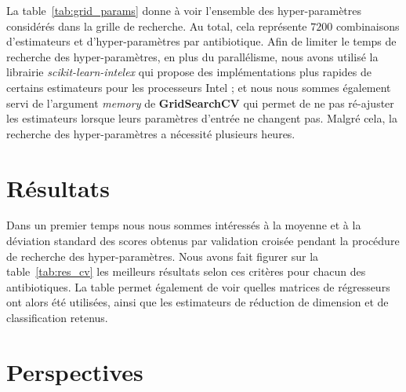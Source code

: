 \documentclass[11pt]{article}
\begin{document}
  La table~\ref{tab:grid_params} donne à voir l'ensemble des hyper-paramètres considérés dans la grille de recherche.
  Au total, cela représente $7200$ combinaisons d'estimateurs et d'hyper-paramètres par antibiotique.
  Afin de limiter le temps de recherche des hyper-paramètres, en plus du parallélisme, nous avons utilisé la librairie \textit{scikit-learn-intelex} qui propose des implémentations plus rapides de certains estimateurs pour les processeurs Intel ;
  et nous nous sommes également servi de l'argument \textit{memory} de \textbf{GridSearchCV} qui permet de ne pas ré-ajuster les estimateurs lorsque leurs paramètres d'entrée ne changent pas.
  Malgré cela, la recherche des hyper-paramètres a nécessité plusieurs heures.

\hypertarget{resultats}{%
\section{Résultats}\label{resultats}}

  Dans un premier temps nous nous sommes intéressés à la moyenne et à la déviation standard des scores obtenus par validation croisée pendant la procédure de recherche des hyper-paramètres.
  Nous avons fait figurer sur la table~\ref{tab:res_cv} les meilleurs résultats selon ces critères pour chacun des antibiotiques.
  La table permet également de voir quelles matrices de régresseurs ont alors été utilisées, ainsi que les estimateurs de réduction de dimension et de classification retenus.

  



\hypertarget{perspectives}{%
\section{Perspectives}\label{perspectives}}
\end{document}
